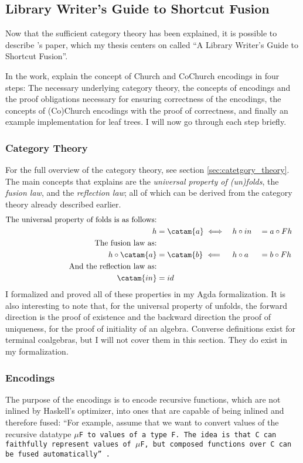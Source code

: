 
\subsection{Library Writer's Guide to Shortcut Fusion}
Now that the sufficient category theory has been explained, it is possible to describe \cite{Harper2011}'s paper, which my thesis centers on called ``A Library Writer's Guide to Shortcut Fusion''.

In the work, \cite{Harper2011} explain the concept of Church and CoChurch encodings in four steps:
The necessary underlying category theory, the concepts of encodings and the proof obligations necessary for ensuring correctness of the encodings, the concepts of (Co)Church encodings with the proof of correctness, and finally an example implementation for leaf trees.
I will now go through each step briefly.

\subsubsection{Category Theory}
For the full overview of the category theory, see section \ref{sec:catetgory_theory}.
The main concepts that \cite{Harper2011} explains are the \textit{universal property of (un)folds}, the \textit{fusion law}, and the \textit{reflection law}; all of which can be derived from the category theory already described earlier.
\begin{alignat*}{3}
\text{The universal property of folds is as follows:} \\
h &= \catam{a} \iff && h \circ in &&= a \circ F h \\
\text{The fusion law as:} \\
h \circ \catam{a} &= \catam{b}~\Longleftarrow && h \circ a &&= b \circ F h \\
\text{And the reflection law as:} \\
\catam{in} &= id
\end{alignat*}
I formalized and proved all of these properties in my Agda formalization.
It is also interesting to note that, for the universal property of unfolds, the forward direction is the proof of existence and the backward direction the proof of uniqueness, for the proof of initiality of an algebra.
Converse definitions exist for terminal coalgebras, but I will not cover them in this section.
They do exist in my formalization.

\subsubsection{Encodings}
The purpose of the encodings is to encode recursive functions, which are not inlined by Haskell's optimizer, into ones that are capable of being inlined and therefore fused:
``For example, assume that we want to convert values of the recursive datatype \tt{$\mu$F} to values of a type \tt{F}.  The idea is that \tt{C} can faithfully represent values of \tt{$\mu$F}, but composed functions over \tt{C} can be fused automatically'' \citep{Harper2011}.

